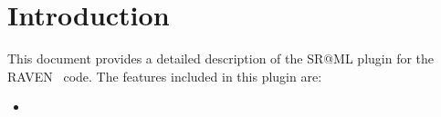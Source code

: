 \section{Introduction}
\label{sec:Introduction}

This document provides a detailed description of the SR@ML plugin for the RAVEN~\cite{RAVEN,RAVENtheoryMan} code.
The features included in this plugin are:
\begin{itemize}
	\item []
\end{itemize}
